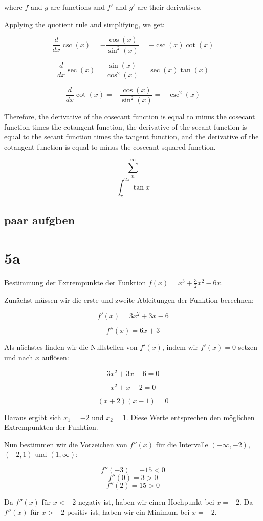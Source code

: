 \documentclass{book}
\begin{document}
where $f$ and $g$ are functions and $f'$ and $g'$ are their derivatives.

Applying the quotient rule and simplifying, we get:

$$\frac{d}{dx} \csc(x) = -\frac{\cos(x)}{\sin^2(x)} = -\csc(x) \cot(x)$$

$$\frac{d}{dx} \sec(x) = \frac{\sin(x)}{\cos^2(x)} = \sec(x) \tan(x)$$

$$\frac{d}{dx} \cot(x) = -\frac{\cos(x)}{\sin^2(x)} = -\csc^2(x)$$

Therefore, the derivative of the cosecant function is equal to minus the
cosecant function times the cotangent function, the derivative of the secant
function is equal to the secant function times the tangent function, and the
derivative of the cotangent function is equal to minus the cosecant squared
function.

$$\displaystyle\sum_{n}^{\infty}$$
\[\displaystyle\int_{\pi}^{2\pi}\tan x\]

\subsection{paar aufgben}
\section{5a}
Bestimmung der Extrempunkte der Funktion $f(x) = x^3 + \frac{3}{2}x^2 - 6x$.

Zunächst müssen wir die erste und zweite Ableitungen der Funktion berechnen:

$$f'(x) = 3x^2 + 3x - 6$$

$$f''(x) = 6x + 3$$

Als nächstes finden wir die Nullstellen von $f'(x)$, indem wir $f'(x) = 0$ setzen und nach $x$ auflösen:

$$3x^2 + 3x - 6 = 0$$

$$x^2 + x - 2 = 0$$

$$(x+2)(x-1) = 0$$

Daraus ergibt sich $x_1=-2$ und $x_2=1$. Diese Werte entsprechen den möglichen Extrempunkten der Funktion.

Nun bestimmen wir die Vorzeichen von $f''(x)$ für die Intervalle $(-\infty,-2)$, $(-2,1)$ und $(1,\infty)$:

$$f''(-3) = -15 < 0$$
$$f''(0) = 3 > 0$$
$$f''(2) = 15 > 0$$

Da $f''(x)$ für $x<-2$ negativ ist, haben wir einen Hochpunkt bei $x=-2$. Da $f''(x)$ für $x>-2$ positiv ist, haben wir ein Minimum bei $x=-2$.
\end{document}
